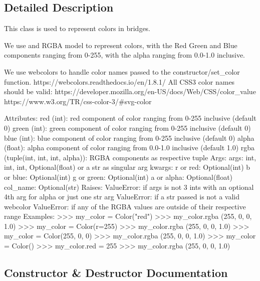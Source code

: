 \subsection{Detailed Description}
\begin{DoxyVerb}This class is used to represent colors in bridges.

We use and RGBA model to represent colors, with the Red Green and Blue components ranging from 0-255,
with the alpha ranging from 0.0-1.0 inclusive.

We use webcolors to handle color names passed to the constructor/set_color function.
https://webcolors.readthedocs.io/en/1.8.1/
All CSS3 color names should be valid:
https://developer.mozilla.org/en-US/docs/Web/CSS/color_value
https://www.w3.org/TR/css-color-3/#svg-color

Attributes:
    red (int): red component of color ranging from 0-255 inclusive (default 0)
    green (int): green component of color ranging from 0-255 inclusive (default 0)
    blue (int): blue component of color ranging from 0-255 inclusive (default 0)
    alpha (float): alpha component of color ranging from 0.0-1.0 inclusive (default 1.0)
    rgba (tuple(int, int, int, alpha)): RGBA components as respective tuple
Args:
    args: int, int, int, Optional(float) or a str as singular arg
    kwargs:
        r or red: Optional(int)
        b or blue: Optional(int)
        g or green: Optional(int)
        a or alpha: Optional(float)
        col_name: Optional(str)
Raises:
    ValueError: if args is not 3 ints with an optional 4th arg for alpha or just one str arg
    ValueError: if a str passed is not a valid webcolor
    ValueError: if any of the RGBA values are outside of their respective range
Examples:
    >>> my_color = Color("red")
    >>> my_color.rgba
    (255, 0, 0, 1.0)
    >>> my_color = Color(r=255)
    >>> my_color.rgba
    (255, 0, 0, 1.0)
    >>> my_color = Color(255, 0, 0)
    >>> my_color.rgba
    (255, 0, 0, 1.0)
    >>> my_color = Color()
    >>> my_color.red = 255
    >>> my_color.rgba
    (255, 0, 0, 1.0)
\end{DoxyVerb}
 

\subsection{Constructor \& Destructor Documentation}
\mbox{\label{classbridges_1_1color_1_1_color_aacbbede0aceb8f1ca36d78379614bb1a}} 
